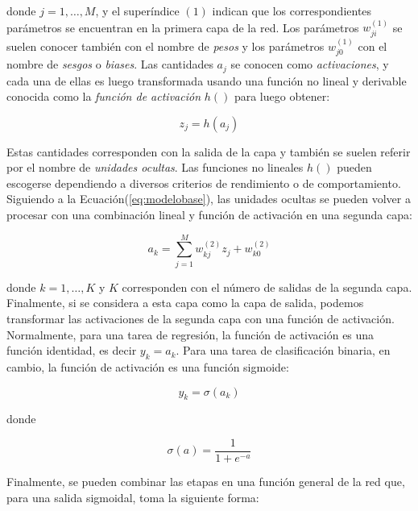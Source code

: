         donde $j = 1, \ldots , M$, y el superíndice $(1)$ indican que los correspondientes parámetros se encuentran en la 
        primera capa de la red. Los parámetros $w_{ji}^{(1)}$ se suelen conocer también con el nombre de \textit{pesos} y 
        los parámetros $ w_{j0}^{(1)}$ con el nombre de \textit{sesgos} o \textit{biases}. Las cantidades $a_j$ se conocen 
        como \textit{activaciones}, y cada una de ellas es luego transformada usando una función no lineal y derivable conocida 
        como la \textit{función de activación} $h()$ para luego obtener:

        \begin{equation}
            z_j = h(a_j)
        \end{equation}

        Estas cantidades corresponden con la salida de la capa y también se suelen referir por el nombre de  \textit{unidades ocultas}.
        Las funciones no lineales $h()$ pueden escogerse dependiendo a diversos criterios de rendimiento o de comportamiento. Siguiendo
        a la Ecuación(\ref{eq:modelobase}), las unidades ocultas se pueden volver a procesar con una combinación lineal y función 
        de activación en una segunda capa:

        \begin{equation}
            a_k = \sum_{j=1}^M w_{kj}^{(2)} z_j + w_{k0}^{(2)}
        \end{equation}

        donde $k = 1, \ldots, K$ y $K$ corresponden con el número de salidas de la segunda capa. Finalmente, si se considera a 
        esta capa como la capa de salida, podemos transformar las activaciones de la segunda capa con una función de activación. 
        Normalmente, para una tarea de regresión, la función de activación es una función identidad, es decir $y_k = a_k$. Para 
        una tarea de clasificación binaria, en cambio, la función de activación es una función sigmoide:

        \begin{equation}
            y_k = \sigma(a_k)
        \end{equation}

        donde
        
        \begin{equation}\label{eq:sigmoide}
            \sigma(a) = \frac{1}{1 + e^{-a}}    
        \end{equation}
        
        Finalmente, se pueden combinar las etapas en una función general de la red que, para una salida sigmoidal, toma la 
        siguiente forma:

